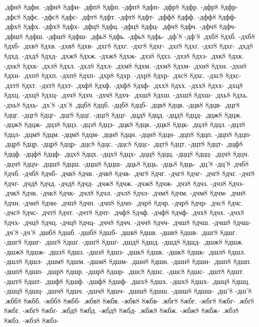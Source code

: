 {.дфн8 8дфн. -дфн8 8дфн-
.дфп8 8дфп. -дфп8 8дфп-
.дфр8 8дфр. -дфр8 8дфр-
.дфс8 8дфс. -дфс8 8дфс-
.дфт8 8дфт. -дфт8 8дфт-
.дфф8 8дфф. -дфф8 8дфф-
.дфх8 8дфх. -дфх8 8дфх-
.дфц8 8дфц. -дфц8 8дфц-
.дфч8 8дфч. -дфч8 8дфч-
.дфш8 8дфш. -дфш8 8дфш-
.дфь8 8дфь. -дфь8 8дфь-
.дф'8 -дф'8
.дхб8 8дхб. -дхб8 8дхб-
.дхв8 8дхв. -дхв8 8дхв-
.дхг8 8дхг. -дхг8 8дхг-
.дхґ8 8дхґ. -дхґ8 8дхґ-
.дхд8 8дхд. -дхд8 8дхд-
.дхж8 8дхж. -дхж8 8дхж-
.дхз8 8дхз. -дхз8 8дхз-
.дхк8 8дхк. -дхк8 8дхк-
.дхл8 8дхл. -дхл8 8дхл-
.дхм8 8дхм. -дхм8 8дхм-
.дхн8 8дхн. -дхн8 8дхн-
.дхп8 8дхп. -дхп8 8дхп-
.дхр8 8дхр. -дхр8 8дхр-
.дхс8 8дхс. -дхс8 8дхс-
.дхт8 8дхт. -дхт8 8дхт-
.дхф8 8дхф. -дхф8 8дхф-
.дхх8 8дхх. -дхх8 8дхх-
.дхц8 8дхц. -дхц8 8дхц-
.дхч8 8дхч. -дхч8 8дхч-
.дхш8 8дхш. -дхш8 8дхш-
.дхь8 8дхь. -дхь8 8дхь-
.дх'8 -дх'8
.дцб8 8дцб. -дцб8 8дцб-
.дцв8 8дцв. -дцв8 8дцв-
.дцг8 8дцг. -дцг8 8дцг-
.дцґ8 8дцґ. -дцґ8 8дцґ-
.дцд8 8дцд. -дцд8 8дцд-
.дцж8 8дцж. -дцж8 8дцж-
.дцз8 8дцз. -дцз8 8дцз-
.дцк8 8дцк. -дцк8 8дцк-
.дцл8 8дцл. -дцл8 8дцл-
.дцм8 8дцм. -дцм8 8дцм-
.дцн8 8дцн. -дцн8 8дцн-
.дцп8 8дцп. -дцп8 8дцп-
.дцр8 8дцр. -дцр8 8дцр-
.дцс8 8дцс. -дцс8 8дцс-
.дцт8 8дцт. -дцт8 8дцт-
.дцф8 8дцф. -дцф8 8дцф-
.дцх8 8дцх. -дцх8 8дцх-
.дцц8 8дцц. -дцц8 8дцц-
.дцч8 8дцч. -дцч8 8дцч-
.дцш8 8дцш. -дцш8 8дцш-
.дць8 8дць. -дць8 8дць-
.дц'8 -дц'8
.дчб8 8дчб. -дчб8 8дчб-
.дчв8 8дчв. -дчв8 8дчв-
.дчг8 8дчг. -дчг8 8дчг-
.дчґ8 8дчґ. -дчґ8 8дчґ-
.дчд8 8дчд. -дчд8 8дчд-
.дчж8 8дчж. -дчж8 8дчж-
.дчз8 8дчз. -дчз8 8дчз-
.дчк8 8дчк. -дчк8 8дчк-
.дчл8 8дчл. -дчл8 8дчл-
.дчм8 8дчм. -дчм8 8дчм-
.дчн8 8дчн. -дчн8 8дчн-
.дчп8 8дчп. -дчп8 8дчп-
.дчр8 8дчр. -дчр8 8дчр-
.дчс8 8дчс. -дчс8 8дчс-
.дчт8 8дчт. -дчт8 8дчт-
.дчф8 8дчф. -дчф8 8дчф-
.дчх8 8дчх. -дчх8 8дчх-
.дчц8 8дчц. -дчц8 8дчц-
.дчч8 8дчч. -дчч8 8дчч-
.дчш8 8дчш. -дчш8 8дчш-
.дч'8 -дч'8
.дшб8 8дшб. -дшб8 8дшб-
.дшв8 8дшв. -дшв8 8дшв-
.дшг8 8дшг. -дшг8 8дшг-
.дшґ8 8дшґ. -дшґ8 8дшґ-
.дшд8 8дшд. -дшд8 8дшд-
.дшж8 8дшж. -дшж8 8дшж-
.дшз8 8дшз. -дшз8 8дшз-
.дшк8 8дшк. -дшк8 8дшк-
.дшл8 8дшл. -дшл8 8дшл-
.дшм8 8дшм. -дшм8 8дшм-
.дшн8 8дшн. -дшн8 8дшн-
.дшп8 8дшп. -дшп8 8дшп-
.дшр8 8дшр. -дшр8 8дшр-
.дшс8 8дшс. -дшс8 8дшс-
.дшт8 8дшт. -дшт8 8дшт-
.дшф8 8дшф. -дшф8 8дшф-
.дшх8 8дшх. -дшх8 8дшх-
.дшц8 8дшц. -дшц8 8дшц-
.дшч8 8дшч. -дшч8 8дшч-
.дшш8 8дшш. -дшш8 8дшш-
.дш'8 -дш'8
.жбб8 8жбб. -жбб8 8жбб-
.жбв8 8жбв. -жбв8 8жбв-
.жбг8 8жбг. -жбг8 8жбг-
.жбґ8 8жбґ. -жбґ8 8жбґ-
.жбд8 8жбд. -жбд8 8жбд-
.жбж8 8жбж. -жбж8 8жбж-
.жбз8 8жбз. -жбз8 8жбз-
}
